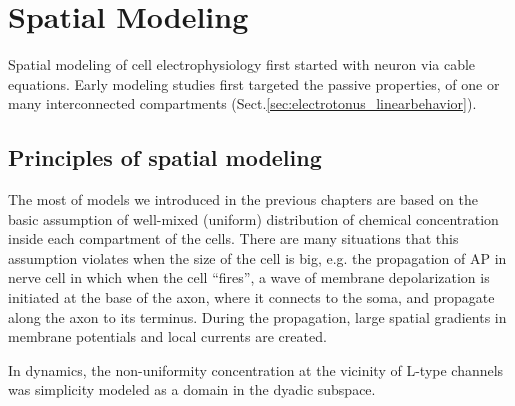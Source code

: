 \chapter{Spatial Modeling}
\label{chap:spatial-modeling}

Spatial modeling of cell electrophysiology first started with neuron via cable
equations.  Early modeling studies first targeted the passive properties, of one
or many interconnected compartments
(Sect.\ref{sec:electrotonus_linearbehavior}).

\section{Principles of spatial modeling}
\label{chap:princ-spat-model}


The most of models we introduced in the previous chapters are based on the basic
assumption of well-mixed (uniform) distribution of chemical concentration inside
each compartment of the cells. There are many situations that this assumption
violates when the size of the cell is big, e.g. the propagation of AP in nerve
cell in which when the cell ``fires'', a wave of membrane depolarization is
initiated at the base of the axon, where it connects to the soma, and propagate
along the axon to its terminus. During the propagation, large spatial gradients
in membrane potentials and local currents are created.

In  dynamics, the non-uniformity  concentration at
the vicinity of L-type  channels was simplicity modeled as a
domain  in the dyadic subspace. 

